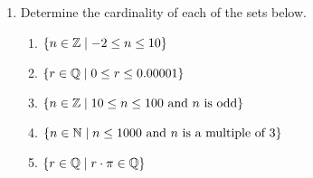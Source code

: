 \begin{enumerate}
    \item Determine the cardinality of each of the sets below.
  \begin{enumerate}
      \item $\{n \in \mathbb{Z} \mid -2 \leq n \leq 10\}$
      \item $\{r \in \mathbb{Q} \mid 0 \leq r \leq 0.00001\}$
      \item $\{n \in \mathbb{Z} \mid 10 \leq n \leq 100 \text{ and } n \text{ is odd}\}$
      \item $\{n \in \mathbb{N} \mid n \leq 1000 \text{ and } n \text{ is a multiple of 3}\}$
      \item $\{r \in \mathbb{Q} \mid r \cdot \pi \in \mathbb{Q}\}$
  \end{enumerate}

\end{enumerate}

